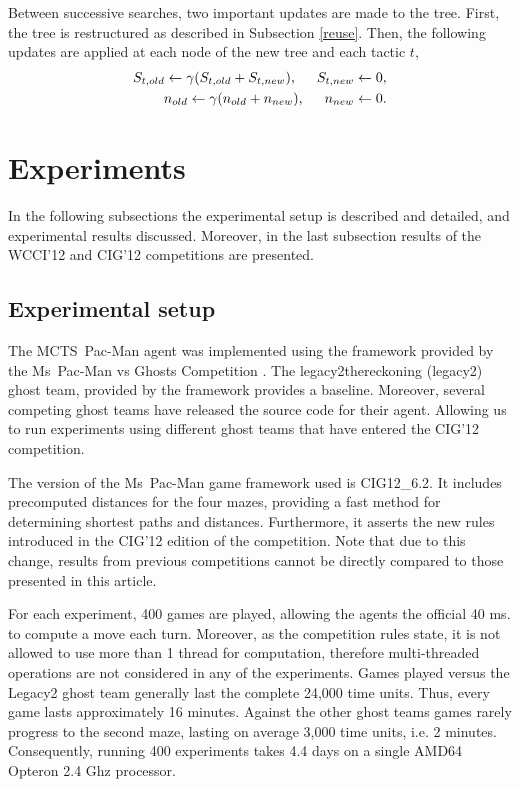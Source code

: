 \documentclass[journal]{IEEEtran}
\begin{document}
Between successive searches, two important updates are made to the tree. First, the tree is restructured as described in Subsection \ref{reuse}. Then, the
following updates are applied at each node of the new tree and each tactic $t$, 
\begin{eqnarray}
S_{t,old} \leftarrow \gamma (S_{t,old} + S_{t,new}), \mbox{\hspace{0.5cm}} S_{t,new} \leftarrow 0, \label{eq:decay1} \\
n_{old} \leftarrow \gamma (n_{old} + n_{new}), \mbox{\hspace{0.5cm}} n_{new} \leftarrow 0.         \label{eq:decay2}
\end{eqnarray}


\section{Experiments}
\label{experiments}
In the following subsections the experimental setup is described and detailed, and experimental results discussed. Moreover, in the last subsection results of the WCCI'12 and CIG'12 competitions are presented.

\subsection{Experimental setup}
The {\sc MCTS~Pac-Man} agent was implemented using the framework provided by the Ms~Pac-Man vs Ghosts Competition \cite{mspacmanvsghost}. The {\sc legacy2thereckoning } ({\sc legacy2}) ghost team, provided by the framework provides a baseline. Moreover, several competing ghost teams have released the source code for their agent. Allowing us to run experiments using different ghost teams that have entered the CIG'12 competition.

The version of the Ms~Pac-Man game framework used is {\sc CIG12\_6.2}. It includes precomputed distances for the four mazes, providing a fast method for determining shortest paths and distances. Furthermore, it asserts the new rules introduced in the CIG'12 edition of the competition. Note that due to this change, results from previous competitions cannot be directly compared to those presented in this article.

For each experiment, 400 games are played, allowing the agents the official 40 ms. to compute a move each turn. Moreover, as the competition rules state, it is not allowed to use more than 1 thread for computation, therefore multi-threaded operations are not considered in any of the experiments. Games played versus the {\sc Legacy2} ghost team generally last the complete 24,000 time units. Thus, every game lasts approximately 16 minutes. Against the other ghost teams games rarely progress to the second maze, lasting on average 3,000 time units, i.e. 2 minutes. Consequently, running 400 experiments takes 4.4 days on a single AMD64 Opteron 2.4 Ghz processor.
\end{document}
